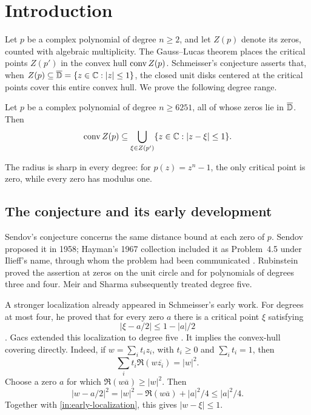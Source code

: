 \section{Introduction}\label{sec:introduction}

Let $p$ be a complex polynomial of degree $n\ge2$, and let $Z(p)$
denote its zeros, counted with algebraic multiplicity. The Gauss--Lucas
theorem places the critical points $Z(p')$ in the convex hull
$\operatorname{conv} Z(p)$. Schmeisser's conjecture asserts that, when
$Z(p)\subseteq\overline{\mathbb D}=\{z\in\mathbb C:|z|\le1\}$, the closed unit disks
centered at the critical points cover this entire convex hull.
We prove the following degree range.

\begin{theorem}\label{thm:main}
Let $p$ be a complex polynomial of degree $n\ge6251$, all of whose
zeros lie in $\overline{\mathbb D}$. Then
\[
 \operatorname{conv} Z(p)\subseteq
 \bigcup_{\xi\in Z(p')}\{z\in\mathbb C:|z-\xi|\le1\}.
\]
\end{theorem}

The radius is sharp in every degree: for $p(z)=z^n-1$, the only
critical point is zero, while every zero has modulus one.

\subsection{The conjecture and its early development}

Sendov's conjecture concerns the same distance bound at each zero of
$p$. Sendov proposed it in 1958; Hayman's 1967 collection included it
as Problem~4.5 under Ilieff's name, through whom the problem had been
communicated \cite{Hayman1967,Schmeisser1971,Schmeisser2003}.
Rubinstein \cite{Rubinstein1968} proved the assertion at zeros on the
unit circle and for polynomials of degrees three and four.
Meir and Sharma \cite{MeirSharma1969} subsequently treated degree five.

A stronger localization already appeared in Schmeisser's early work.
For degrees at most four, he proved that for every zero $a$ there is
a critical point $\xi$ satisfying
\begin{equation}\label{in:early-localization}
             |\xi-a/2|\le1-|a|/2
\end{equation}
\cite{Schmeisser1969}. Gacs extended this localization to degree five
\cite{Gacs1971}. It implies the convex-hull covering directly.
Indeed, if $w=\sum_i t_i z_i$, with $t_i\ge0$ and $\sum_i t_i=1$,
then
\[
 \sum_i t_i\Re(w\overline{z_i})=|w|^2.
\]
Choose a zero $a$ for which $\Re(w\overline a)\ge|w|^2$. Then
\[
 |w-a/2|^2=|w|^2-\Re(w\overline a)+|a|^2/4
 \le|a|^2/4.
\]
Together with \eqref{in:early-localization}, this gives $|w-\xi|\le1$.

